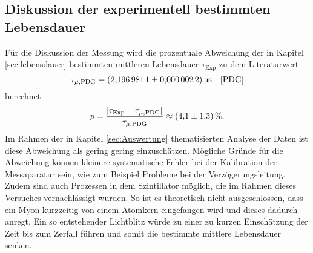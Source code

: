 \subsection{Diskussion der experimentell bestimmten Lebensdauer}
Für die Diskussion der Messung wird die prozentuale Abweichung der in Kapitel \ref{sec:lebensdauer} bestimmten mittleren Lebensdauer $\tau_\text{Exp}$ 
zu dem Literaturwert 
\begin{equation*}
    \tau_{\mu,\text{PDG}}=\SI{2.1969811 \pm0.0000022}{\micro\second} \quad\text{\cite{PDG}}    
\end{equation*}
berechnet
\begin{equation*}
    p=\frac{|\tau_\text{Exp}-\tau_{\mu,\text{PDG}}|}{\tau_{\mu,\text{PDG}}}\approx \SI{4.1\pm1.3}{\percent}.
\end{equation*}
Im Rahmen der in Kapitel \ref{sec:Auswertung} thematisierten Analyse der Daten ist diese Abweichung als gering gering einzuschätzen. Mögliche Gründe für die Abweichung 
können kleinere systematische Fehler bei der Kalibration der Messaparatur sein, wie zum Beispiel Probleme bei der Verzögerungsleitung. Zudem sind auch Prozessen in dem
Szintillator möglich, die im Rahmen dieses Versuches vernachlässigt wurden. So ist es theoretisch nicht ausgeschlossen, dass ein Myon kurzzeitig von einem Atomkern 
eingefangen wird und dieses dadurch anregt. Ein so entstehender Lichtblitz würde zu einer zu kurzen Einschätzung der Zeit bis zum Zerfall führen und somit die 
bestimmte mittlere Lebensdauer senken.